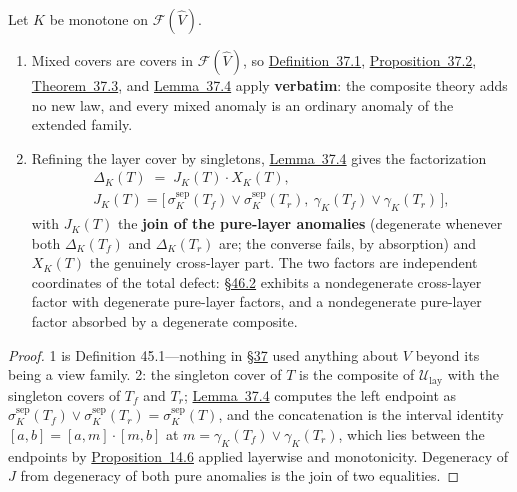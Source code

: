 \begin{thmplain}

Let \(K\) be monotone on \(\mathcal{F}(\widehat V)\).

\begin{enumerate}
\def\labelenumi{\arabic{enumi}.}
\tightlist
\item
  Mixed covers are covers in \(\mathcal{F}(\widehat{V})\), so \hyperlink{stmt:37.1}{Definition~37.1}, \hyperlink{stmt:37.2}{Proposition~37.2}, \hyperlink{stmt:37.3}{Theorem~37.3}, and \hyperlink{stmt:37.4}{Lemma~37.4} apply \textbf{verbatim}: the composite theory adds no new law, and every mixed anomaly is an ordinary anomaly of the extended family.
\item
  Refining the layer cover by singletons, \hyperlink{stmt:37.4}{Lemma~37.4} gives the factorization
  \[\begin{gathered}\Delta_K(T) \;=\; J_K(T) \cdot X_K(T), \\ J_K(T) = \big[\, \sigma^{\mathrm{sep}}_K(T_f) \vee \sigma^{\mathrm{sep}}_K(T_r),\ \gamma_K(T_f) \vee \gamma_K(T_r) \,\big],\end{gathered}\]
  with \(J_K(T)\) the \textbf{join of the pure-layer anomalies} (degenerate whenever both \(\Delta_K(T_f)\) and \(\Delta_K(T_r)\) are; the converse fails, by absorption) and \(X_K(T)\) the genuinely cross-layer part. The two factors are independent coordinates of the total defect: \hyperlink{sec:46.2}{§46.2} exhibits a nondegenerate cross-layer factor with degenerate pure-layer factors, and a nondegenerate pure-layer factor absorbed by a degenerate composite.
\end{enumerate}
\end{thmplain}

\begin{proof}

1 is Definition 45.1---\hspace{0pt}nothing in \hyperlink{sec:37}{§37} used anything about \(V\) beyond its being a view family. 2: the singleton cover of \(T\) is the composite of \(\mathcal{U}_{\mathrm{lay}}\) with the singleton covers of \(T_f\) and \(T_r\); \hyperlink{stmt:37.4}{Lemma~37.4} computes the left endpoint as \(\sigma^{\mathrm{sep}}_K(T_f) \vee \sigma^{\mathrm{sep}}_K(T_r) = \sigma^{\mathrm{sep}}_K(T)\), and the concatenation is the interval identity \([a,b] = [a,m]\cdot[m,b]\) at \(m = \gamma_K(T_f) \vee \gamma_K(T_r)\), which lies between the endpoints by \hyperlink{stmt:14.6}{Proposition~14.6} applied layerwise and monotonicity. Degeneracy of \(J\) from degeneracy of both pure anomalies is the join of two equalities.
\end{proof}

